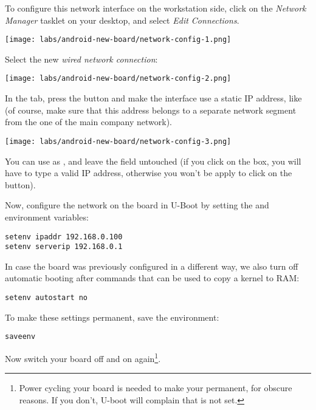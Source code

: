 To configure this network interface on the workstation side, click on
the {\em Network Manager} tasklet on your desktop, and select {\em
  Edit Connections}.

\begin{center}
\texttt{[image: labs/android-new-board/network-config-1.png]}
\end{center}

Select the new {\em wired network connection}:

\begin{center}
\texttt{[image: labs/android-new-board/network-config-2.png]}
\end{center}

In the  tab, press the  button
and make the interface use a static IP
address, like  (of course, make sure that this
address belongs to a separate network segment from the one of the main
company network).

\begin{center}
\texttt{[image: labs/android-new-board/network-config-3.png]}
\end{center}

You can use  as , and leave the
 field untouched (if you click on the  box, you
will have to type a valid IP address, otherwise you won't be apply to
click on the  button).

Now, configure the network on the board in U-Boot by setting the 
and  environment variables:

\begin{verbatim}
setenv ipaddr 192.168.0.100
setenv serverip 192.168.0.1
\end{verbatim}

In case the board was previously configured in a different way, we
also turn off automatic booting after commands that can be used to
copy a kernel to RAM:

\begin{verbatim}
setenv autostart no
\end{verbatim}

To make these settings permanent, save the environment:

\begin{verbatim}
saveenv
\end{verbatim}

Now switch your board off and on again\footnote{Power cycling your
  board is needed to make your  permanent, for obscure
  reasons. If you don't, U-boot will complain that  is not
  set.}.

